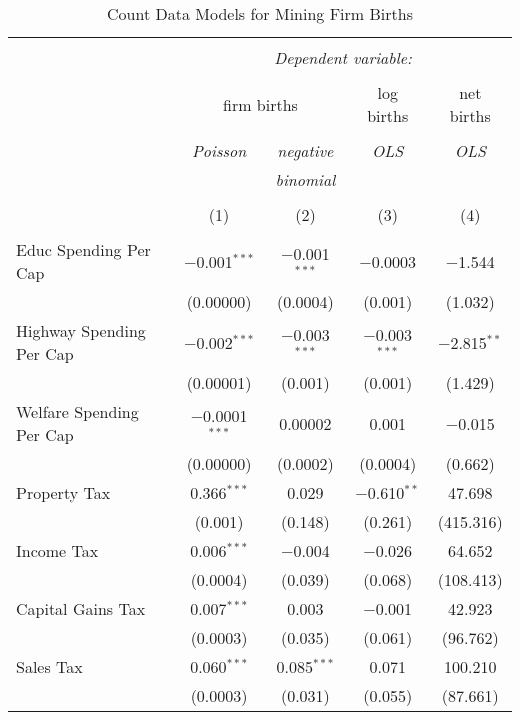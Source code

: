 
\begin{table}[!htbp] \centering 
  \caption{Count Data Models for Mining Firm Births} 
  \label{} 
\begin{tabular}{@{\extracolsep{5pt}}lcccc} 
\\[-1.8ex]\hline 
\hline \\[-1.8ex] 
 & \multicolumn{4}{c}{\textit{Dependent variable:}} \\ 
\cline{2-5} 
\\[-1.8ex] & \multicolumn{2}{c}{firm births} & log births & net births \\ 
\\[-1.8ex] & \textit{Poisson} & \textit{negative} & \textit{OLS} & \textit{OLS} \\ 
 & \textit{} & \textit{binomial} & \textit{} & \textit{} \\ 
\\[-1.8ex] & (1) & (2) & (3) & (4)\\ 
\hline \\[-1.8ex] 
 Educ Spending Per Cap & $-$0.001$^{***}$ & $-$0.001$^{***}$ & $-$0.0003 & $-$1.544 \\ 
  & (0.00000) & (0.0004) & (0.001) & (1.032) \\ 
  Highway Spending Per Cap  & $-$0.002$^{***}$ & $-$0.003$^{***}$ & $-$0.003$^{***}$ & $-$2.815$^{**}$ \\ 
  & (0.00001) & (0.001) & (0.001) & (1.429) \\ 
  Welfare Spending Per Cap  & $-$0.0001$^{***}$ & 0.00002 & 0.001 & $-$0.015 \\ 
  & (0.00000) & (0.0002) & (0.0004) & (0.662) \\ 
  Property Tax & 0.366$^{***}$ & 0.029 & $-$0.610$^{**}$ & 47.698 \\ 
  & (0.001) & (0.148) & (0.261) & (415.316) \\ 
  Income Tax & 0.006$^{***}$ & $-$0.004 & $-$0.026 & 64.652 \\ 
  & (0.0004) & (0.039) & (0.068) & (108.413) \\ 
  Capital Gains Tax & 0.007$^{***}$ & 0.003 & $-$0.001 & 42.923 \\ 
  & (0.0003) & (0.035) & (0.061) & (96.762) \\ 
  Sales Tax & 0.060$^{***}$ & 0.085$^{***}$ & 0.071 & 100.210 \\ 
  & (0.0003) & (0.031) & (0.055) & (87.661) \\ 

\end{tabular}
\end{table}
